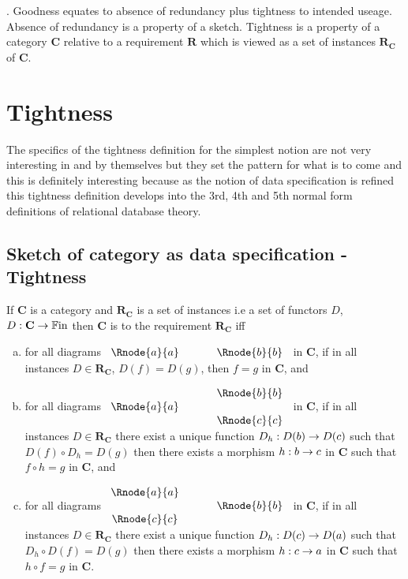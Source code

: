 \documentclass[10pt,a4paper]{article}
\newcounter{para}
\newcommand\note{\par\refstepcounter{para}\thepara.\space}
\newcommand{\catc}[1][C]{\textbf{#1}}
\newcommand{\reqt}{\textbf{R}}
\newcommand{\reqtc}[1][\catc]{\reqt_{#1}}
\newcommand{\Fin}{\ensuremath{\mathbb{F\mathrm{in}} }}
\begin{document}
\note
Goodness equates to absence of redundancy plus tightness to intended useage. Absence of redundancy is a property of a sketch. Tightness
is a property of a category $\catc$ relative to a requirement $\reqt$ which is viewed as a set of instances $\reqtc$ of $\catc$.

\section*{Tightness}
The specifics of the tightness definition for the simplest notion  are not very interesting in and by themselves but they set the pattern for what is to come and this is definitely interesting because as the notion of data specification is refined this tightness definition develops into the 3rd, 4th and 5th normal form definitions of relational database theory.
\subsection*{Sketch of category as data specification - Tightness}
\begin{definition}
If $\catc$ is a category and $\reqtc$ is a set of instances i.e a set of functors $D$, $D: \catc \morph \Fin$ then $\catc$ is 
 to the requirement $\reqtc$ iff
\begin{enumerate}[(a)]

\item
for all diagrams
$
\begin{array}{c p{0.5cm} c  }
 \Rnode{a}{a}            &&   \Rnode{b}{b}
\end{array} 
$
in $\catc$,  if in all instances $D \in \reqtc$, $D(f)=D(g)$, 
then $f=g$ in $\catc$, and 
\item for all diagrams
$
\begin{array}{c p{0.5cm} c  }
             &&   \Rnode{b}{b} \\[0.01cm]
\Rnode{a}{a} &&                \\[0.01cm] 
             &&   \Rnode{c}{c}         
\end{array} 
$
in $\catc$, if in all instances $D \in \reqtc$ there exist a unique function $D_h : D(b) \rightarrow D(c)$ such that
$D(f) \circ D_h = D(g)$ then there exists a morphism $h:b \rightarrow c$ in $\catc$ such that $f \circ h = g$ in $\catc$, and
\item for all diagrams
$
\begin{array}{c p{0.5cm} c  }
\Rnode{a}{a} &&                \\[0.01cm] 
             &&   \Rnode{b}{b} \\[0.01cm]
\Rnode{c}{c}         
\end{array} 
$
in $\catc$, if in all instances $D \in \reqtc$ there exist a unique function $D_h : D(c) \rightarrow D(a)$ such that
$D_h \circ D(f) = D(g)$ then there exists a morphism $h:c \rightarrow a$ in $\catc$ such that $h \circ f = g$ in $\catc$.
\end{enumerate}
\end{definition}
\end{document}
